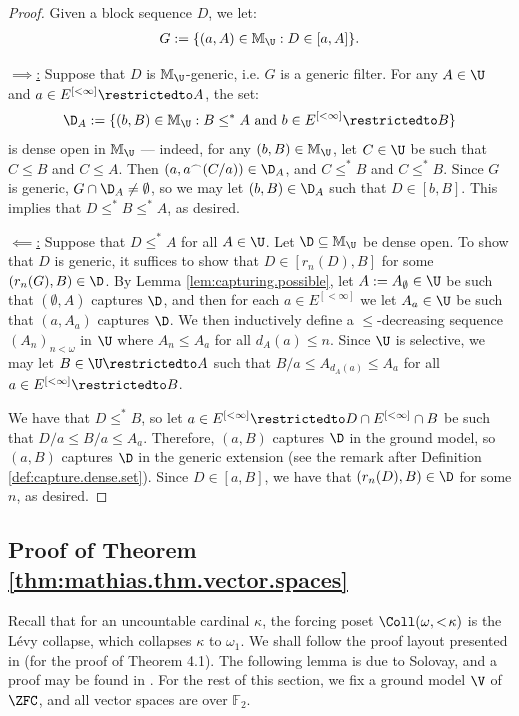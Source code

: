 \documentclass[11pt,reqno]{amsart}
\begin{document}
\begin{proof}
    Given a block sequence $D$, we let:
    \begin{align*}
        G := \{(a,A) \in \mathbb{M}_\U : D \in [a,A]\}.
    \end{align*}

    \underline{$\implies$:} Suppose that $D$ is $\mathbb{M}_\U$-generic, i.e. $G$ is a generic filter. For any $A \in \U$ and $a \in E^{[<\infty]}\restrictedto A$, the set:
    \begin{align*}
        \D_A := \{(b,B) \in \mathbb{M}_\U : B \leq^* A \text{ and } b \in E^{[<\infty]}\restrictedto B\}
    \end{align*}
    is dense open in $\mathbb{M}_\U$ --- indeed, for any $(b,B) \in \mathbb{M}_\U$, let $C \in \U$ be such that $C \leq B$ and $C \leq A$. Then $(a,a^\frown(C/a)) \in \D_A$, and $C \leq^* B$ and $C \leq^* B$. Since $G$ is generic, $G \cap \D_A \neq \emptyset$, so we may let $(b,B) \in \D_A$ such that $D \in [b,B]$. This implies that $D \leq^* B \leq^* A$, as desired.

    \underline{$\impliedby$:} Suppose that $D \leq^* A$ for all $A \in \U$. Let $\D \subseteq \mathbb{M}_\U$ be dense open. To show that $D$ is generic, it suffices to show that $D \in [r_n(D),B]$ for some $(r_n(G),B) \in \D$. By Lemma \ref{lem:capturing.possible}, let $A := A_\emptyset \in \U$ be such that $(\emptyset,A)$ captures $\D$, and then for each $a \in E^{[<\infty]}$ we let $A_a \in \U$ be such that $(a,A_a)$ captures $\D$. We then inductively define a $\leq$-decreasing sequence $(A_n)_{n<\omega}$ in $\U$ where $A_n \leq A_a$ for all $d_A(a) \leq n$. Since $\U$ is selective, we may let $B \in \U\restrictedto A$ such that $B/a \leq A_{d_A(a)} \leq A_a$ for all $a \in E^{[<\infty]}\restrictedto B$. 

    We have that $D \leq^* B$, so let $a \in E^{[<\infty]}\restrictedto D \cap E^{[<\infty]} \cap B$  be such that $D/a \leq B/a \leq A_a$. Therefore, $(a,B)$ captures $\D$ in the ground model, so $(a,B)$ captures $\D$ in the generic extension (see the remark after Definition \ref{def:capture.dense.set}). Since $D \in [a,B]$, we have that $(r_n(D),B) \in \D$ for some $n$, as desired.
\end{proof}

\subsection{Proof of Theorem \ref{thm:mathias.thm.vector.spaces}}
Recall that for an uncountable cardinal $\kappa$, the forcing poset $\Coll(\omega,<\!\kappa)$ is the L\'{e}vy collapse, which collapses $\kappa$ to $\omega_1$. We shall follow the proof layout presented in \cite{NN18} (for the proof of Theorem 4.1). The following lemma is due to Solovay, and a proof may be found in \cite{solovay}. For the rest of this section, we fix a ground model $\V$ of $\ZFC$, and all vector spaces are over $\mathbb{F}_2$.
\end{document}
